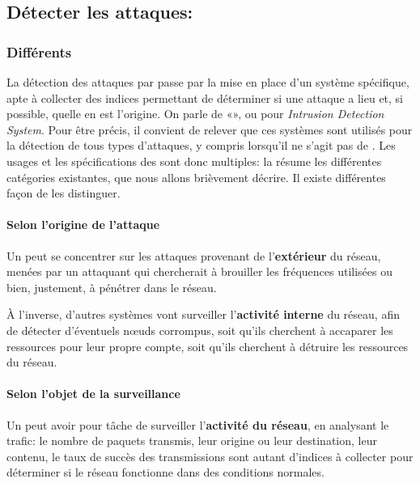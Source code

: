 \subsection{Détecter les attaques: \idss}

    \subsubsection{Différents \idss}
La détection des attaques par \dds passe par la mise en place d'un système spécifique, apte à collecter des indices permettant de déterminer si une attaque a lieu et, si possible, quelle en est l'origine.
On parle de «\ids», ou \IDS pour \textit{Intrusion Detection System}.
Pour être précis, il convient de relever que ces systèmes sont utilisés pour la détection de tous types d'attaques, y compris lorsqu'il ne s'agit pas de \dds.
Les usages et les spécifications des \IDS sont donc multiples: la  résume les différentes catégories existantes, que nous allons brièvement décrire.
Il existe différentes façon de les distinguer.


        \paragraph{Selon l'origine de l'attaque}
Un \ids peut se concentrer sur les attaques provenant de l'\textbf{extérieur} du réseau, menées par un attaquant qui chercherait à brouiller les fréquences utilisées ou bien, justement, à pénétrer dans le réseau.

À l'inverse, d'autres systèmes vont surveiller l'\textbf{activité interne} du réseau, afin de détecter d'éventuels nœuds corrompus, soit qu'ils cherchent à accaparer les ressources pour leur propre compte, soit qu'ils cherchent à détruire les ressources du réseau.

\pagebreak %

        \paragraph{Selon l'objet de la surveillance}\label{ea:sss:hids}
Un \IDS peut avoir pour tâche de surveiller l'\textbf{activité du réseau}, en analysant le trafic: le nombre de paquets transmis, leur origine ou leur destination, leur contenu, le taux de succès des transmissions sont autant d'indices à collecter pour déterminer si le réseau fonctionne dans des conditions normales.

